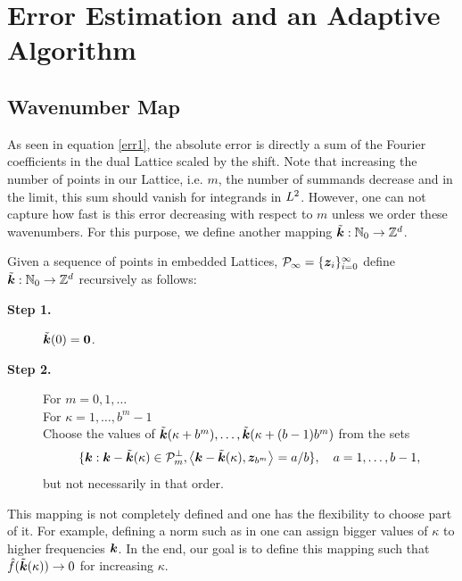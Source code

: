 \documentclass[graybox]{svmult}
\newcommand{\Z}{\mathbb{Z}} %
\newcommand{\N}{\mathbb{N}} %
\newcommand{\bszero}{\boldsymbol{0}} %
\newcommand{\bsz}{\boldsymbol{z}}    %
\begin{document}
\section{Error Estimation and an Adaptive Algorithm}\label{secalgo}

\subsection{Wavenumber Map}

As seen in equation \eqref{err1}, the absolute error is directly a sum of the Fourier coefficients in the dual Lattice scaled by the shift. Note that increasing the number of points in our Lattice, i.e. $m$, the number of summands decrease and in the limit, this sum should vanish for integrands in $L^2$. However, one can not capture how fast is this error decreasing with respect to $m$ unless we order these wavenumbers. For this purpose, we define another mapping $\tvk: \N_0 \to \Z^d$.

\begin{definition} \label{wavenummapdef} Given a sequence of points in embedded Lattices, $\cp_{\infty} = \{\bsz_i\}_{i=0}^{\infty}$ define $\tvk: \N_0 \to \Z^d$ recursively as follows:
\begin{description}
\item[\textbf{Step 1.}] $\tvk(0)=\bszero$.

\item[\textbf{Step 2.}] For $m=0, 1, \ldots$ \\
\hspace*{1.3cm} For $\kappa = 1, \ldots, b^{m} -1 $ \\
\hspace*{1.6cm} Choose the values of $\tilde{\boldsymbol{k}}(\kappa+b^{m}), \ldots, \tilde{\boldsymbol{k}}(\kappa+(b-1)b^{m})$ from the sets
\[
\{\bsk : \bsk - \tvk(\kappa) \in \cp_{m}^{\perp}, \ip{\bsk - \tvk(\kappa)}{\bsz_{b^m}}=a/b \}, \quad a=1, \ldots, b-1,
\]
\hspace*{1.6cm} but not necessarily in that order.
\end{description}
\end{definition}

This mapping is not completely defined and one has the flexibility to choose part of it. For example, defining a norm such as in \cite[Chap. 4]{SloJoe94} one can assign bigger values of $\kappa$ to higher frequencies $\boldsymbol{k}$. In the end, our goal is to define this mapping such that $\hat{f}(\tilde{\boldsymbol{k}}(\kappa))\rightarrow 0$ for increasing $\kappa$.
\end{document}
